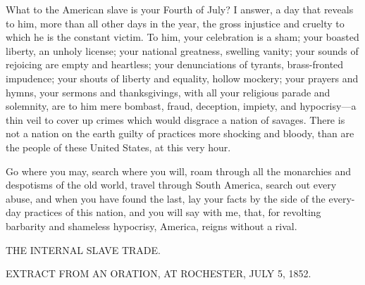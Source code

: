 What to the American slave is your Fourth of July? I answer, a day that
reveals to him, more than all other days in the year, the gross
injustice and cruelty to which he is the constant victim. To him, your
celebration is a sham; your boasted liberty, an unholy license; your
national greatness, swelling vanity; your sounds of rejoicing are empty
and heartless; your denunciations of tyrants, brass-fronted impudence;
your shouts of liberty and equality, hollow mockery; your prayers and
hymns, your sermons and thanksgivings, with all your religious parade
and solemnity, are to him mere bombast, fraud, deception, impiety, and
hypocrisy---a thin veil to cover up crimes which would disgrace a nation
of savages. There is not a nation on the earth guilty of practices more
shocking and bloody, than are the people of these United States, at this
very hour.

Go where you may, search where you will, roam through all the monarchies
and despotisms of the old world, travel through South America, search
out every abuse, and when you have found the last, lay your facts by the
side of the every-day practices of this nation, and you will say with
me, that, for revolting barbarity and shameless hypocrisy, America,
reigns without a rival.

{\protect\hypertarget{ux5cux7bux5cux7bux5cux7b1ux5cux7dux5cux7dux5cux7d}{}{}}

{}

{THE INTERNAL SLAVE TRADE.}

{EXTRACT FROM AN ORATION, AT ROCHESTER, JULY 5, 1852.}

